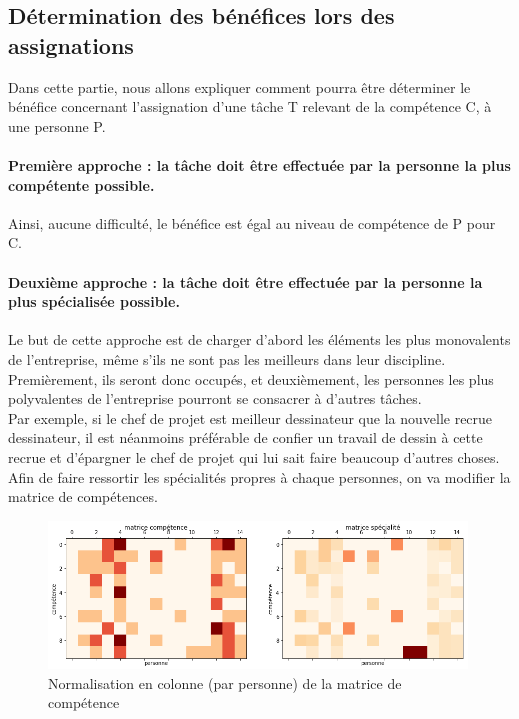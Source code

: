 \documentclass[12pt]{article}
\begin{document}
\subsection{Détermination des bénéfices lors des assignations}

Dans cette partie, nous allons expliquer comment pourra être déterminer le bénéfice concernant l'assignation d'une tâche T relevant de la compétence C, à une personne P.

\paragraph{Première approche : la tâche doit être effectuée par la personne la plus compétente possible.}


Ainsi, aucune difficulté, le bénéfice est égal au niveau de compétence de P pour C.

\paragraph{Deuxième approche : la tâche doit être effectuée par la personne la plus spécialisée possible.}


Le but de cette approche est de charger d'abord les éléments les plus monovalents de l'entreprise, même s'ils ne sont pas les meilleurs dans leur discipline. Premièrement, ils seront donc occupés, et deuxièmement, les personnes les plus polyvalentes de l'entreprise pourront se consacrer à d'autres tâches.\\



Par exemple, si le chef de projet est meilleur dessinateur que la nouvelle recrue dessinateur, il est néanmoins préférable de confier un travail de dessin à cette recrue et d'épargner le chef de projet qui lui sait faire beaucoup d'autres choses.\\

Afin de faire ressortir les spécialités propres à chaque personnes, on va modifier la matrice de compétences.
\newpage

\begin{figure}[H]
\begin{center}
\caption{Normalisation en colonne (par personne) de la matrice de compétence}
\includegraphics[width=0.99\textwidth]{2matrixassignation}
\end{center}
\end{figure}
\end{document}
